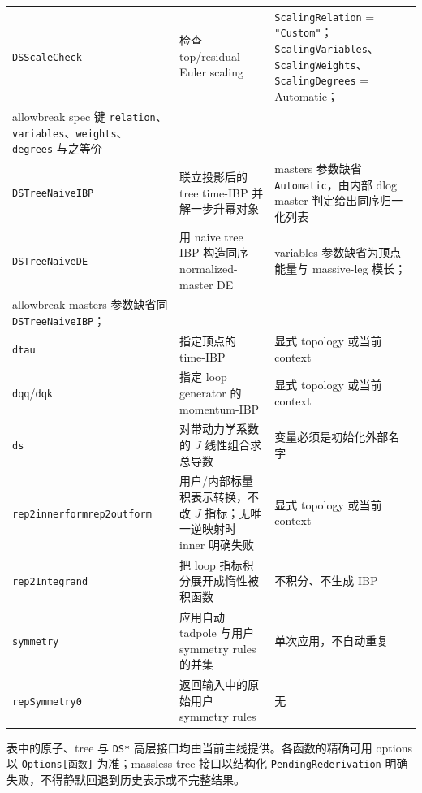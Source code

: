 ﻿\documentclass[a4paper,11pt]{article}
\begin{document}
\begin{longtable}{@{}>{\raggedright\arraybackslash}p{}>{\raggedright\arraybackslash}p{}>{\raggedright\arraybackslash}p{}@{}}
\texttt{DSScaleCheck} & 检查 top/residual Euler scaling & \texttt{ScalingRelation} = \texttt{"Custom"}；\allowbreak\texttt{ScalingVariables}、\allowbreak\texttt{ScalingWeights}、\allowbreak\texttt{ScalingDegrees} = Automatic；\\allowbreak spec 键 \texttt{relation}、\allowbreak\texttt{variables}、\allowbreak\texttt{weights}、\allowbreak\texttt{degrees} 与之等价 \\
\texttt{DSTreeNaiveIBP} & 联立投影后的 tree time-IBP 并解一步升幂对象 & masters 参数缺省 \texttt{Automatic}，由内部 dlog master 判定给出同序归一化列表 \\
\texttt{DSTreeNaiveDE} & 用 naive tree IBP 构造同序 normalized-master DE & variables 参数缺省为顶点能量与 massive-leg 模长；\\allowbreak masters 参数缺省同 \texttt{DSTreeNaiveIBP}； \\
\texttt{dtau} & 指定顶点的 time-IBP & 显式 topology 或当前 context \\
\texttt{dqq}/\texttt{dqk} & 指定 loop generator 的 momentum-IBP & 显式 topology 或当前 context \\
\texttt{ds} & 对带动力学系数的 $J$ 线性组合求总导数 & 变量必须是初始化外部名字 \\
\texttt{rep2innerform}\newline\texttt{rep2outform} & 用户/内部标量积表示转换，不改 $J$ 指标；无唯一逆映射时 inner 明确失败 & 显式 topology 或当前 context \\
\texttt{rep2Integrand} & 把 loop 指标积分展开成惰性被积函数 & 不积分、不生成 IBP \\
\texttt{symmetry} & 应用自动 tadpole 与用户 symmetry rules 的并集 & 单次应用，不自动重复 \\
\texttt{repSymmetry0} & 返回输入中的原始用户 symmetry rules & 无 \\
\end{longtable}
\endgroup

表中的原子、tree 与 \texttt{DS*} 高层接口均由当前主线提供。各函数的精确可用 options 以 \texttt{Options[函数]} 为准；massless tree 接口以结构化 \texttt{PendingRederivation} 明确失败，不得静默回退到历史表示或不完整结果。
\end{document}
